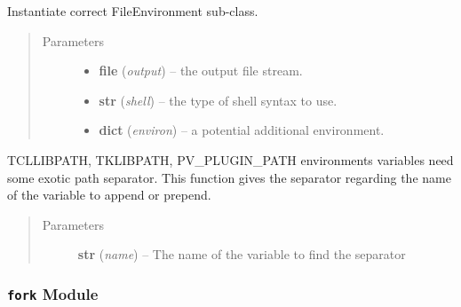\documentclass[a4paper,10pt,english]{sphinxmanual}
\begin{document}

\begin{fulllineitems}
\label{commands/apidoc/src:src.fileEnviron.get_file_environ}
Instantiate correct FileEnvironment sub-class.
\begin{quote}\begin{description}
\item[{Parameters}] \leavevmode\begin{itemize}
\item {} 
\textbf{file} (\emph{output}) -- the output file stream.

\item {} 
\textbf{str} (\emph{shell}) -- the type of shell syntax to use.

\item {} 
\textbf{dict} (\emph{environ}) -- a potential additional environment.

\end{itemize}

\end{description}\end{quote}

\end{fulllineitems}


\begin{fulllineitems}
\label{commands/apidoc/src:src.fileEnviron.special_path_separator}
TCLLIBPATH, TKLIBPATH, PV\_PLUGIN\_PATH environments variables need
some exotic path separator.
This function gives the separator regarding the name of the variable
to append or prepend.
\begin{quote}\begin{description}
\item[{Parameters}] \leavevmode
\textbf{str} (\emph{name}) -- The name of the variable to find the separator

\end{description}\end{quote}

\end{fulllineitems}



\subsubsection{\texttt{fork} Module}
\label{commands/apidoc/src:fork-module}\label{commands/apidoc/src:module-src.fork}
\end{document}
